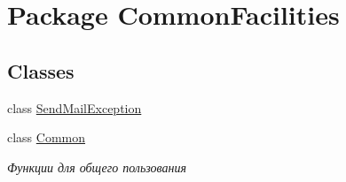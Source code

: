 \hypertarget{namespace_common_facilities}{
\section{Package CommonFacilities}
\label{namespace_common_facilities}
}
\subsection*{Classes}
\begin{DoxyCompactItemize}
\item 
class \hyperlink{class_common_facilities_1_1_send_mail_exception}{SendMailException}
\item 
class \hyperlink{class_common_facilities_1_1_common}{Common}
\begin{DoxyCompactList}\small\item\em Функции для общего пользования \item\end{DoxyCompactList}\end{DoxyCompactItemize}
